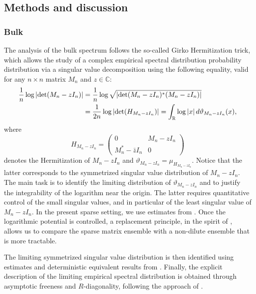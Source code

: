 \documentclass[11pt,oneside]{amsart}
\theoremstyle{plain}
\numberwithin{equation}{section}
\newcommand{\R}{\mathbb{R}}
\newcommand{\esd}[1]{\mu_{#1}}
\begin{document}
\subsection{Methods and discussion} \label{subsec:sp-methods}
\subsubsection*{Bulk}
The analysis of the bulk spectrum follows the so-called 
Girko  Hermitization trick,  which allows the study of a complex empirical spectral distribution probability distribution via a singular value decomposition using the following equality, valid for any $n\times n$ matrix $M_n$ and $z\in \mathbb{C}$:
\begin{equation} \label{eq:Girko}
\begin{split}
     \frac{1}{n}  \log |{\rm det} (M_n-zI_n)| 
 &=  \frac{1}{n}  \log \sqrt{|{\rm det} (M_n-zI_n)^*(M_n-zI_n)|} \\
 &=  \frac{1}{2n}  \log |{{\rm det} (H_{M_n-zI_n}})|
  =\int_{\R} \log|x|\,d\vartheta_{M_n-zI_n}(x),
 \end{split}
 \end{equation}
 where
\begin{equation}\label{sym}H_{M_n-zI_n}=\begin{pmatrix} 0 &M_n-zI_n \\ M_n^*-\bar zI_n & 0 \end{pmatrix}\end{equation}
 denotes the Hermitization of $M_n-zI_n$ and 
    $\vartheta_{M_n-zI_n}=\esd{H_{M_n-zI_n}}.$
Notice that the latter corresponds to the symmetrized singular value distribution of $M_n-zI_n$. The main task is to identify the limiting distribution of $\vartheta_{M_n-zI_n}$ and to justify the integrability of the logarithm near the origin. The latter requires quantitative control of the small singular values, and in particular of the least singular value of $M_n-zI_n$. In the present sparse setting, we use estimates from \cite{TV,BasakRudelson19}. Once the logarithmic potential is controlled, a replacement principle, in the spirit of \cite{BasakCookZetouni}, allows us to compare the sparse matrix ensemble with a non-dilute ensemble that is more tractable.

The limiting symmetrized singular value distribution is then identified using estimates and deterministic equivalent results from \cite{CookI}. Finally, the explicit description of the limiting empirical spectral distribution is obtained through asymptotic freeness and $R$-diagonality, following the approach of \cite{HL,GKT}.
\end{document}
